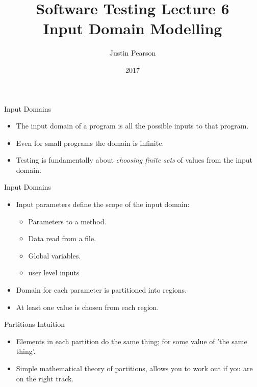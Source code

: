 \documentclass{beamer}
\title{Software Testing  Lecture 6 \\ Input Domain Modelling}
\author{Justin Pearson}
\date{2017}
\begin{document}
\lstset{language=C}

\begin{frame}
  \maketitle
\end{frame}
\begin{frame}{Input Domains}
  \begin{itemize}
  \item The input domain of a program is all the possible inputs to
    that program.
  \item Even for small programs the domain is infinite.
  \item Testing is fundamentally about {\em choosing finite sets} of
    values from the input domain.
  \end{itemize}
  
\end{frame}
\begin{frame}{Input Domains}
  \begin{itemize}
  \item Input parameters define the scope of the input domain:
    \begin{itemize}
    \item Parameters to a method.
    \item Data read from a file.
    \item Global variables.
    \item user level inputs
    \end{itemize}
  \item Domain for each parameter is partitioned into regions.
  \item At least one value is chosen from each region.
  \end{itemize}
\end{frame}
\begin{frame}{Partitions Intuition} 
  \begin{itemize}
  \item Elements in each partition do the same thing; for some value
    of  'the same thing'.
  \item Simple mathematical theory of partitions, allows you to work
    out if you are on the right track.
  \end{itemize}
\end{frame}
\end{document}
